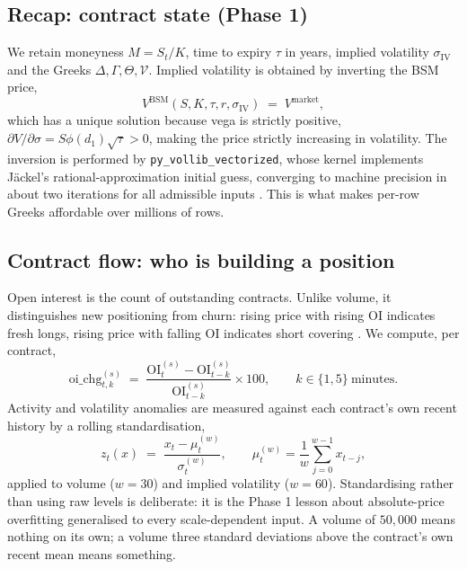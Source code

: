 \documentclass[11pt,a4paper]{article}
\newcommand{\code}[1]{\texttt{#1}}
\begin{document}
\subsection{Recap: contract state (Phase 1)}

We retain moneyness $M = S_t/K$, time to expiry $\tau$ in years, implied volatility
$\sigma_{\text{IV}}$ and the Greeks $\Delta,\Gamma,\Theta,\mathcal{V}$. Implied
volatility is obtained by inverting the BSM price,
\begin{equation}
V^{\text{BSM}}(S,K,\tau,r,\sigma_{\text{IV}}) \;=\; V^{\text{market}} ,
\end{equation}
which has a unique solution because vega is strictly positive,
$\partial V/\partial\sigma = S\phi(d_1)\sqrt{\tau} > 0$, making the price strictly
increasing in volatility. The inversion is performed by \code{py\_vollib\_vectorized},
whose kernel implements Jäckel's rational-approximation initial guess, converging to
machine precision in about two iterations for all admissible inputs \cite{letsberational,
pyvollib}. This is what makes per-row Greeks affordable over millions of rows.

\subsection{Contract flow: who is building a position}

Open interest is the count of outstanding contracts. Unlike volume, it distinguishes new
positioning from churn: rising price with rising OI indicates fresh longs, rising price
with falling OI indicates short covering \cite{groww}. We compute, per contract,
\begin{equation}
\text{oi\_chg}^{(s)}_{t,k} \;=\; \frac{\text{OI}^{(s)}_t - \text{OI}^{(s)}_{t-k}}
{\text{OI}^{(s)}_{t-k}}\times 100, \qquad k \in \{1,5\}\ \text{minutes}.
\end{equation}
Activity and volatility anomalies are measured against each contract's own recent
history by a rolling standardisation,
\begin{equation}
z_t(x) \;=\; \frac{x_t - \mu_{t}^{(w)}}{\sigma_{t}^{(w)}},\qquad
\mu_t^{(w)} = \frac{1}{w}\sum_{j=0}^{w-1} x_{t-j},
\end{equation}
applied to volume ($w=30$) and implied volatility ($w=60$). Standardising rather than
using raw levels is deliberate: it is the Phase 1 lesson about absolute-price overfitting
generalised to every scale-dependent input. A volume of $50{,}000$ means nothing on its
own; a volume three standard deviations above the contract's own recent mean means
something.
\end{document}
